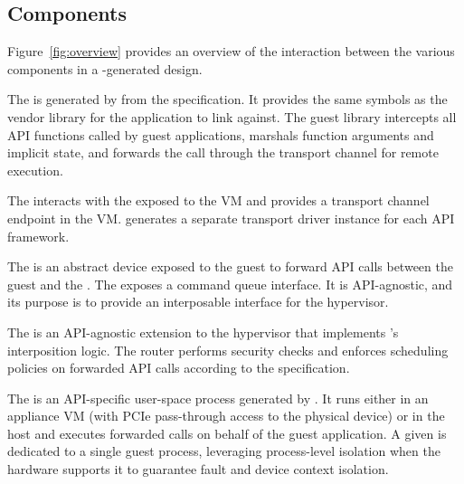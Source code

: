 \subsection{\AvA Components}
\label{sub:components}
Figure~\ref{fig:overview} provides an overview of the interaction
between the various components in a \AvA-generated design.

The  is generated by \CAvA from the \Lapis
specification. It provides the same symbols as the vendor library for the
application to link against.
The guest library intercepts all API functions called by
guest applications, marshals function arguments and implicit
state, and forwards the call through the transport channel for
remote execution.

The  interacts with the \vdev exposed
to the VM and provides a transport channel endpoint in the VM.
\CAvA generates a separate transport driver instance for each API framework.

The \parname{\vdev}
is an abstract device exposed to the
guest to forward API calls
between the guest and the \worker.
The \vdev exposes %
a command queue interface.
It is API-agnostic, and its purpose is to
provide an interposable interface for the hypervisor.

The  is an API-agnostic extension to the hypervisor that
implements \AvA's interposition logic. The router performs security
checks and enforces scheduling policies on forwarded API calls according
to the \Lapis specification.

The \parname{\worker} is an API-specific user-space process generated
by \CAvA. It runs either in an appliance VM (with PCIe pass-through access to the physical device) or in the host
and executes forwarded calls on behalf of the guest application.
A given \Worker is dedicated to a single guest process, leveraging
process-level isolation when the hardware supports it to guarantee fault and device context isolation.

